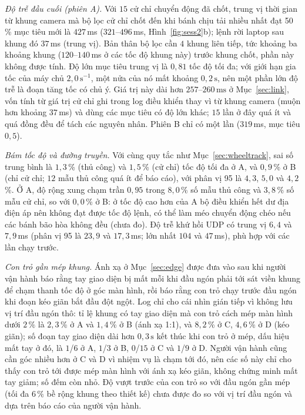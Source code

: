 \documentclass[5p,twocolumn]{elsarticle}
\begin{document}
\emph{Độ trễ đầu cuối (phiên A).} Với $15$ cử chỉ chuyển động đã chốt, trung vị thời gian từ khung camera mà bộ lọc cử chỉ chốt đến khi bánh chịu tải nhiều nhất đạt 50\,\% mục tiêu mới là $427$\,ms ($321$--$496$\,ms, Hình~\ref{fig:sess2}b); lệnh rời laptop sau khung đó $37$\,ms (trung vị). Bản thân bộ lọc cần $4$ khung liên tiếp, tức khoảng ba khoảng khung ($120$--$140$\,ms ở các tốc độ khung này) trước khung chốt, phần này không được tính. Độ lớn mục tiêu trung vị là $0{,}81$ tốc độ tối đa; với giới hạn gia tốc của máy chủ $2{,}0\,\mathrm{s^{-1}}$, một nửa của nó mất khoảng $0{,}2\,\mathrm{s}$, nên một phần lớn độ trễ là đoạn tăng tốc có chủ ý. Giá trị này dài hơn $257$--$260\,\mathrm{ms}$ ở Mục~\ref{sec:link}, vốn tính từ giá trị cử chỉ ghi trong log điều khiển thay vì từ khung camera (muộn hơn khoảng $37$\,ms) và dùng các mục tiêu có độ lớn khác; $15$ lần ở đây quá ít và quá đồng đều để tách các nguyên nhân. Phiên B chỉ có một lần ($319$\,ms, mục tiêu $0{,}5$).

\emph{Bám tốc độ và đường truyền.} Với cùng quy tắc như Mục~\ref{sec:wheeltrack}, sai số trung bình là $1{,}3$\,\% (thủ công) và $1{,}5$\,\% (cử chỉ) tốc độ tối đa ở A, và $0{,}9$\,\% ở B (chỉ cử chỉ; $12$ mẫu thủ công quá ít để báo cáo), với phân vị 95 là $4{,}3$, $5{,}0$ và $4{,}2$\,\%. Ở A, độ rộng xung chạm trần $0{,}95$ trong $8{,}0$\,\% số mẫu thủ công và $3{,}8$\,\% số mẫu cử chỉ, so với $0{,}0$\,\% ở B: ở tốc độ cao hơn của A bộ điều khiển hết dư địa điện áp nên không đạt được tốc độ lệnh, có thể làm méo chuyển động chéo nếu các bánh bão hòa không đều (chưa đo). Độ trễ khứ hồi UDP có trung vị $6{,}4$ và $7{,}9$\,ms (phân vị 95 là $23{,}9$ và $17{,}3$\,ms; lớn nhất $104$ và $47$\,ms), phù hợp với các lần chạy trước.

\emph{Con trỏ gần mép khung.} Ánh xạ ở Mục~\ref{sec:edge} được đưa vào sau khi người vận hành báo rằng tay giao diện bị mất mỗi khi đầu ngón phải tới sát viền khung để chạm thanh tốc độ ở góc màn hình, rồi báo rằng con trỏ chạy trước đầu ngón khi đoạn kéo giãn bắt đầu đột ngột. Log chỉ cho cái nhìn gián tiếp vì không lưu vị trí đầu ngón thô: tỉ lệ khung có tay giao diện mà con trỏ cách mép màn hình dưới $2\,\%$ là $2{,}3$\,\% ở A và $1{,}4$\,\% ở B (ánh xạ 1:1), và $8{,}2$\,\% ở C, $4{,}6$\,\% ở D (kéo giãn); số đoạn tay giao diện dài hơn $0{,}3\,\mathrm{s}$ kết thúc khi con trỏ ở mép, dấu hiệu mất tay ở đó, là $1$/$6$ ở A, $1$/$3$ ở B, $0$/$15$ ở C và $1$/$9$ ở D. Người vận hành cũng cần góc nhiều hơn ở C và D vì nhiệm vụ là chạm tới đó, nên các số này chỉ cho thấy con trỏ tới được mép màn hình với ánh xạ kéo giãn, không chứng minh mất tay giảm; số đếm còn nhỏ. Độ vượt trước của con trỏ so với đầu ngón gần mép (tối đa $6\,\%$ bề rộng khung theo thiết kế) chưa được đo so với vị trí đầu ngón và dựa trên báo cáo của người vận hành.
\end{document}
